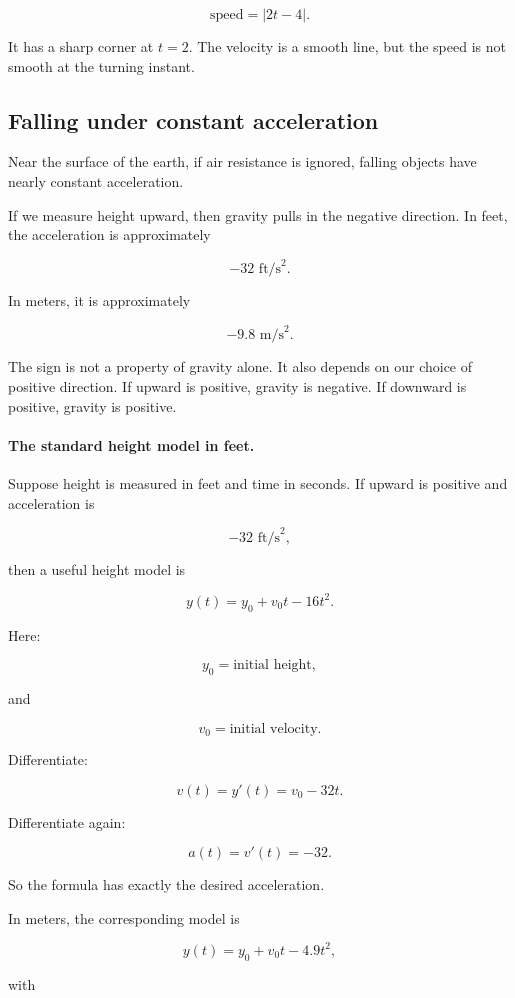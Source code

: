 \[
\text{speed}=|2t-4|.
\]

It has a sharp corner at \(t=2\).  The velocity is a smooth line, but the speed is not smooth at the turning instant.

\subsection{Falling under constant acceleration}
\label{subsec:falling-under-constant-acceleration}

Near the surface of the earth, if air resistance is ignored, falling objects have nearly constant acceleration.

If we measure height upward, then gravity pulls in the negative direction.  In feet, the acceleration is approximately

\[
-32\text{ ft/s}^2.
\]

In meters, it is approximately

\[
-9.8\text{ m/s}^2.
\]

The sign is not a property of gravity alone.  It also depends on our choice of positive direction.  If upward is positive, gravity is negative.  If downward is positive, gravity is positive.

\paragraph{The standard height model in feet.}
Suppose height is measured in feet and time in seconds.  If upward is positive and acceleration is

\[
-32\text{ ft/s}^2,
\]

then a useful height model is

\[
y(t)=y_0+v_0t-16t^2.
\]

Here:

\[
y_0=\text{initial height},
\]

and

\[
v_0=\text{initial velocity}.
\]

Differentiate:

\[
v(t)=y'(t)=v_0-32t.
\]

Differentiate again:

\[
a(t)=v'(t)=-32.
\]

So the formula has exactly the desired acceleration.

In meters, the corresponding model is

\[
y(t)=y_0+v_0t-4.9t^2,
\]

with

